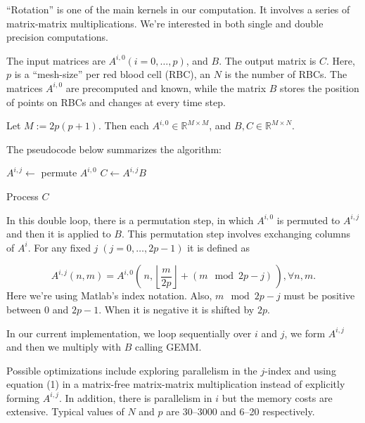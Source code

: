 \documentclass[11pt]{article}
\newlength\commLen
\newcommand{\defeq}{:=}
\begin{document}
``Rotation'' is one of the main kernels in our computation. It
involves a series of matrix-matrix multiplications. We're interested
in both single and double precision computations.

The input matrices are $A^{i,0} (i=0, \dots, p)$, and $B$. The output
matrix is $C$.  Here, $p$ is a ``mesh-size'' per red blood cell (RBC),
an $N$ is the number of RBCs.  The matrices $A^{i,0}$ are precomputed
and known, while the matrix $B$ stores the position of points on RBCs
and changes at every time step.

Let $M \defeq 2p(p+1)$. Then each $A^{i,0} \in \mathbb{R}^{M\times
  M}$, and $B, C \in \mathbb{R}^{M\times N}$.


The pseudocode below summarizes the algorithm:

\setlength\commLen{250pt} 
\begin{algorithm}[!hbt]
  \begin{algorithmic}
    
    \STATE $A^{i,j} \leftarrow$ permute $A^{i,0}$ 
    \STATE $C\leftarrow A^{i,j} B$

    \STATE Process $C$
    
    \ENDFOR
    \ENDFOR
    
  \end{algorithmic}
\end{algorithm}

In this double loop, there is a permutation step, in which $A^{i,0}$
is permuted to $A^{i,j}$ and then it is applied to $B$.  This
permutation step involves exchanging columns of $A^i$. For any fixed
$j\;(j=0,\dots,2p-1)$ it is defined as

\begin{equation}
A^{i,j}(n,m) = A^{i,0}\left(\, n, \left\lfloor \frac{m}{2p} \right\rfloor +
  (m\mod 2p - j)\, \right), \forall n,m.
\end{equation}
Here we're using Matlab's index notation.  Also, $m\mod 2p - j$ must
be positive between $0$ and $2p-1$. When it is negative it is shifted
by $2p$.

In our current implementation, we loop sequentially over $i$ and $j$,
we form $A^{i,j}$ and then we multiply with $B$ calling GEMM.

Possible optimizations include exploring parallelism in the $j$-index
and using equation (1) in a matrix-free matrix-matrix multiplication
instead of explicitly forming $A^{i,j}$. In addition, there is
parallelism in $i$ but the memory costs are extensive. Typical values
of $N$ and $p$ are 30--3000 and  6--20 respectively.
\end{document}
